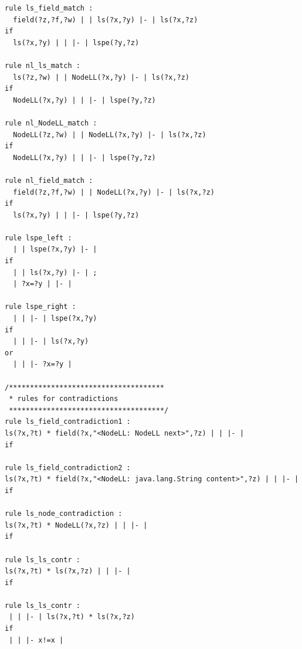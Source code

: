 \documentclass[11pt]{article}
\begin{document}
\begin{verbatim}
rule ls_field_match :
  field(?z,?f,?w) | | ls(?x,?y) |- | ls(?x,?z)
if
  ls(?x,?y) | | |- | lspe(?y,?z)

rule nl_ls_match :
  ls(?z,?w) | | NodeLL(?x,?y) |- | ls(?x,?z)
if
  NodeLL(?x,?y) | | |- | lspe(?y,?z)

rule nl_NodeLL_match :
  NodeLL(?z,?w) | | NodeLL(?x,?y) |- | ls(?x,?z)
if
  NodeLL(?x,?y) | | |- | lspe(?y,?z)

rule nl_field_match :
  field(?z,?f,?w) | | NodeLL(?x,?y) |- | ls(?x,?z)
if
  ls(?x,?y) | | |- | lspe(?y,?z)

rule lspe_left :
  | | lspe(?x,?y) |- | 
if
  | | ls(?x,?y) |- | ;
  | ?x=?y | |- | 

rule lspe_right :
  | | |- | lspe(?x,?y) 
if
  | | |- | ls(?x,?y) 
or
  | | |- ?x=?y | 

/*************************************
 * rules for contradictions 
 *************************************/
rule ls_field_contradiction1 :
ls(?x,?t) * field(?x,"<NodeLL: NodeLL next>",?z) | | |- | 
if

rule ls_field_contradiction2 :
ls(?x,?t) * field(?x,"<NodeLL: java.lang.String content>",?z) | | |- | 
if

rule ls_node_contradiction :
ls(?x,?t) * NodeLL(?x,?z) | | |- | 
if

rule ls_ls_contr :
ls(?x,?t) * ls(?x,?z) | | |- |
if

rule ls_ls_contr :
 | | |- | ls(?x,?t) * ls(?x,?z)
if
 | | |- x!=x |
\end{verbatim}
\end{document}
